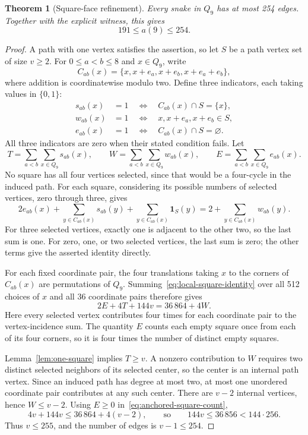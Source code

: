 \documentclass[11pt,a4paper]{article}
\newtheorem{theorem}{Theorem}[section]
\theoremstyle{definition}
\theoremstyle{remark}
\newcommand{\Q}{Q}
\begin{document}
\begin{theorem}[Square-face refinement]\label{thm:square-upper}
Every snake in $\Q_9$ has at most 254 edges. Together with the explicit witness, this gives
\[
\boxed{191\le a(9)\le254.}
\]
\end{theorem}
\begin{proof}
A path with one vertex satisfies the assertion, so let $S$ be a path vertex set of size $v\ge2$. For $0\le a<b\le8$ and $x\in\Q_9$, write
\[
C_{ab}(x)=\{x,x+e_a,x+e_b,x+e_a+e_b\},
\]
where addition is coordinatewise modulo two. Define three indicators, each taking values in $\{0,1\}$:
\begin{align*}
s_{ab}(x)&=1\quad\Longleftrightarrow\quad C_{ab}(x)\cap S=\{x\},\\
w_{ab}(x)&=1\quad\Longleftrightarrow\quad x,x+e_a,x+e_b\in S,\\
e_{ab}(x)&=1\quad\Longleftrightarrow\quad C_{ab}(x)\cap S=\varnothing.
\end{align*}
All three indicators are zero when their stated condition fails. Let
\[
T=\sum_{a<b}\sum_{x\in\Q_9}s_{ab}(x),\qquad
W=\sum_{a<b}\sum_{x\in\Q_9}w_{ab}(x),\qquad
E=\sum_{a<b}\sum_{x\in\Q_9}e_{ab}(x).
\]
No square has all four vertices selected, since that would be a four-cycle in the induced path. For each square, considering its possible numbers of selected vertices, zero through three, gives
\begin{equation}\label{eq:local-square-identity}
2e_{ab}(x)+\sum_{y\in C_{ab}(x)}s_{ab}(y)
 +\sum_{y\in C_{ab}(x)}\mathbf{1}_S(y)
=2+\sum_{y\in C_{ab}(x)}w_{ab}(y).
\end{equation}
For three selected vertices, exactly one is adjacent to the other two, so the last sum is one. For zero, one, or two selected vertices, the last sum is zero; the other terms give the asserted identity directly.

For each fixed coordinate pair, the four translations taking $x$ to the corners of $C_{ab}(x)$ are permutations of $\Q_9$. Summing~\eqref{eq:local-square-identity} over all 512 choices of $x$ and all 36 coordinate pairs therefore gives
\begin{equation}\label{eq:anchored-square-count}
2E+4T+144v=36\,864+4W.
\end{equation}
Here every selected vertex contributes four times for each coordinate pair to the vertex-incidence sum. The quantity $E$ counts each empty square once from each of its four corners, so it is four times the number of distinct empty squares.

Lemma~\ref{lem:one-square} implies $T\ge v$. A nonzero contribution to $W$ requires two distinct selected neighbors of its selected center, so the center is an internal path vertex. Since an induced path has degree at most two, at most one unordered coordinate pair contributes at any such center. There are $v-2$ internal vertices, hence $W\le v-2$. Using $E\ge0$ in~\eqref{eq:anchored-square-count},
\[
4v+144v\le36\,864+4(v-2),
\qquad\text{so}\qquad144v\le36\,856<144\cdot256.
\]
Thus $v\le255$, and the number of edges is $v-1\le254$.
\end{proof}
\end{document}

